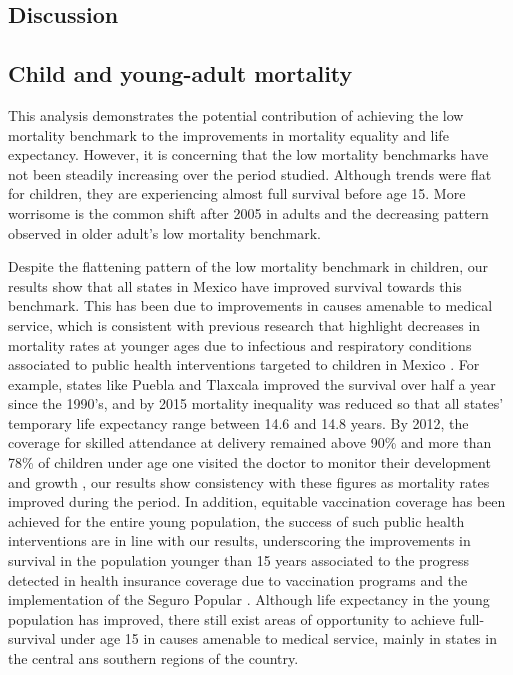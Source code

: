 \documentclass[11.5pt]{article}
\begin{document}
\begin{spacing}{1.5}


\section*{Discussion}
\subsection*{Child and young-adult mortality}
This analysis demonstrates the potential contribution of achieving the low mortality benchmark to the improvements in mortality equality and life expectancy. However, it is concerning that the low mortality benchmarks have not been steadily increasing over the period studied. Although trends were flat for children, they are experiencing almost full survival before age 15. More worrisome is the common shift after 2005 in adults and the decreasing pattern observed in older adult's low mortality benchmark. 

Despite the flattening pattern of the low mortality benchmark in children, our results show that all states in Mexico have improved survival towards this benchmark. This has been due to improvements in causes amenable to medical service, which is consistent with previous research that highlight decreases in mortality rates at younger ages due to infectious and respiratory conditions associated to public health interventions targeted to children in Mexico \citep{sepulveda2006}. For example, states like Puebla and Tlaxcala improved the survival over half a year since the 1990's, and by 2015 mortality inequality was reduced so that all states' temporary life expectancy range between 14.6 and 14.8 years. By 2012, the coverage for skilled attendance at delivery remained above 90\% and more than 78\% of children under age one visited the doctor to monitor their development and growth  \citep{urquieta2015evolution}, our results show consistency with these figures as mortality rates improved during the period. In addition, equitable vaccination coverage has been achieved for the entire young population, the success of such public health interventions are in line with our results, underscoring the improvements in survival in the population younger than 15 years associated to the progress detected in health insurance coverage due to vaccination programs and the implementation of the Seguro Popular \citep{urquieta2015evolution}. Although life expectancy in the young population has improved, there still exist areas of opportunity to achieve full-survival under age 15 in causes amenable to medical service, mainly in states in the central ans southern regions of the country. 


\end{spacing}
\end{document}
